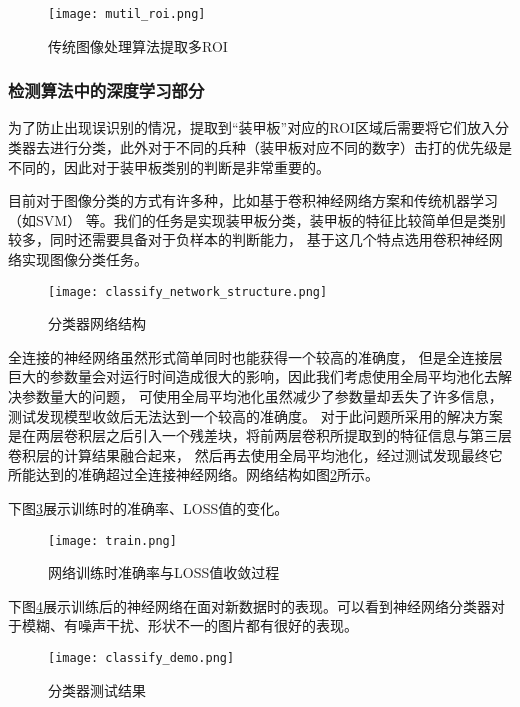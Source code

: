 \begin{figure}[H]
    \centering
    \texttt{[image: mutil\_roi.png]} 
    \caption{传统图像处理算法提取多ROI} 
    \label{传统图像处理算法提取多ROI}
\end{figure}

\subsubsection{检测算法中的深度学习部分}

为了防止出现误识别的情况，提取到“装甲板”对应的ROI区域后需要将它们放入分类器去进行分类，此外对于不同的兵种（装甲板对应不同的数字）击打的优先级是不同的，因此对于装甲板类别的判断是非常重要的。\par
目前对于图像分类的方式有许多种，比如基于卷积神经网络\cite{krizhevsky2017imagenet}方案和传统机器学习（如SVM\cite{cortes1995support}）
等。我们的任务是实现装甲板分类，装甲板的特征比较简单但是类别较多，同时还需要具备对于负样本的判断能力，
基于这几个特点选用卷积神经网络实现图像分类任务。
\begin{figure}[H]
    \centering
    \texttt{[image: classify\_network\_structure.png]} 
    \caption{分类器网络结构} 
    \label{分类器网络结构}
\end{figure}
全连接的神经网络虽然形式简单同时也能获得一个较高的准确度，
但是全连接层巨大的参数量会对运行时间造成很大的影响，因此我们考虑使用全局平均池化去解决参数量大的问题，
可使用全局平均池化虽然减少了参数量却丢失了许多信息，测试发现模型收敛后无法达到一个较高的准确度。
对于此问题所采用的解决方案是在两层卷积层之后引入一个残差块\cite{he2016deep}，将前两层卷积所提取到的特征信息与第三层卷积层的计算结果融合起来，
然后再去使用全局平均池化，经过测试发现最终它所能达到的准确超过全连接神经网络。网络结构如图\ref{分类器网络结构}所示。


下图\ref{网络训练时准确率与LOSS值收敛过程}展示训练时的准确率、LOSS值的变化。
\begin{figure}[H]
    \centering
    \texttt{[image: train.png]} 
    \caption{网络训练时准确率与LOSS值收敛过程} 
    \label{网络训练时准确率与LOSS值收敛过程}
\end{figure}


下图\ref{分类器测试结果}展示训练后的神经网络在面对新数据时的表现。可以看到神经网络分类器对于模糊、有噪声干扰、形状不一的图片都有很好的表现。
\begin{figure}[H]
    \centering
    \texttt{[image: classify\_demo.png]} 
    \caption{分类器测试结果} 
    \label{分类器测试结果}
\end{figure}

